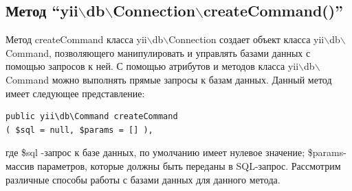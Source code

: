 \documentclass[a4paper,14pt]{extreport}
\theoremstyle{definition}
\begin{document}
\subsection{Метод “yii$\backslash$db$\backslash$Connection$\backslash$createCommand()”}
Метод createCommand класса yii$\backslash$db$\backslash$Connection создает объект класса yii$\backslash$db$\backslash$Command, позволяющего манипулировать и управлять базами данных с помощью запросов к ней. С помощью атрибутов и методов класса yii$\backslash$db$\backslash$Command можно выполнять прямые запросы к базам данных. Данный метод имеет следующее представление:
\begin{verbatim}
public yii\db\Command createCommand
( $sql = null, $params = [] ),
\end{verbatim}
где
\$sql -запрос к базе данных, по умолчанию имеет нулевое значение;
\$params-массив параметров, которые должны быть переданы в SQL-запрос.
 Рассмотрим различные способы работы с базами данных для данного метода.
\end{document}
